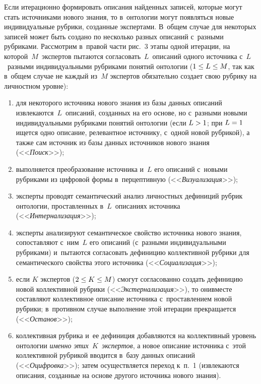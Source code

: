 {\begin{multicols}{2}
    
    Если итерационно формировать описания найден\-ных записей, которые 
могут стать источниками нового знания, то в~онтологии могут появляться 
новые индивидуальные рубрики, созданные экспертами. В~общем случае для 
некоторых записей может быть создано по несколько разных описаний 
с~разными рубриками. Рассмотрим в~правой части рис.~3 этапы одной 
итерации, на которой~$M$~экспертов пытаются согласовать~$L$~описаний 
одного источника с~$L$~разными индивидуальными рубриками понятий 
онтологии ($1\hm\leq L\hm\leq M$, так как в~общем случае не каждый из~$M$ 
экспертов обязательно создает свою рубрику на личностном уровне):
    \begin{enumerate}[(1)]
\item для некоторого источника нового знания из базы данных описаний 
извлекаются~$L$~описаний, созданных на его основе, но с~разными новыми 
индивидуальными рубриками понятий онтологии (если $L\hm>1$; при 
$L\hm=1$ ищется одно описание, релевантное источнику, с~одной новой 
рубрикой), а также сам источник из базы данных источников нового знания 
(<<\textit{Поиск}>>);
\item выполняется преобразование источника и~$L$ его описаний с~новыми 
рубриками из цифровой формы в~перцептивную (<<\textit{Визуализация}>>);
\item эксперты проводят семантический анализ личностных дефиниций 
рубрик онтологии, проставленных в~$L$~описаниях источника 
(<<\textit{Интернализация}>>);
\item эксперты анализируют семантическое свойство источника нового 
знания, сопоставляют с~ним~$L$ его описаний (с~разными 
индивидуальными рубриками) и~пытаются согласовать дефиницию 
коллективной рубрики для семантического свойства этого источника 
(<<\textit{Социализация}>>);
\item если $K$ экспертов ($2\hm\leq K\hm\leq M$) смогут согласованно 
создать дефиницию новой коллективной рубрики 
(<<\textit{Экстернализация}>>), то они\linebreak вмес\-те составляют коллективное 
описание источника с~проставлением новой рубрики; в~противном случае 
выполнение этой итерации прекращается (<<\textit{Останов}>>);
\item коллективная рубрика и~ее дефиниция до\-бав\-ля\-ют\-ся на коллективный 
уровень онтологии \textit{именно этих~$K$~экспертов}, а новое описание 
источника с~этой коллективной рубрикой вводится в~базу данных описаний 
(<<\textit{Оцифровка}>>); затем осуществляется переход к~п.~1 
(извлекаются описания, созданные на основе другого источника нового 
знания).
\end{enumerate}
  

\end{multicols}}
